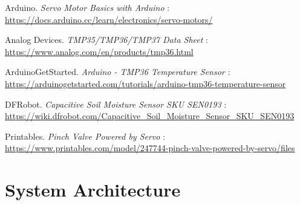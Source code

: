 \documentclass[a4paper,11pt]{article}
\begin{document}
\begin{thebibliography}{9}

Arduino. \textit{Servo Motor Basics with Arduino} : \\
\url{https://docs.arduino.cc/learn/electronics/servo-motors/}

Analog Devices. \textit{TMP35/TMP36/TMP37 Data Sheet} : \\
\url{https://www.analog.com/en/products/tmp36.html} 

ArduinoGetStarted. \textit{Arduino - TMP36 Temperature Sensor} : \\
\url{https://arduinogetstarted.com/tutorials/arduino-tmp36-temperature-sensor}

DFRobot. \textit{Capacitive Soil Moisture Sensor SKU SEN0193} : \\
\url{https://wiki.dfrobot.com/Capacitive_Soil_Moisture_Sensor_SKU_SEN0193}

Printables. \textit{Pinch Valve Powered by Servo} : \\
\url{https://www.printables.com/model/247744-pinch-valve-powered-by-servo/files}

\end{thebibliography}

\newpage
\appendix

\section{System Architecture}

\begin{table}[H]
    \centering
    \renewcommand{\arraystretch}{1.5} 
    \caption{Component Order Summary}
    \label{tab:component_order}
\end{table}
\end{document}

